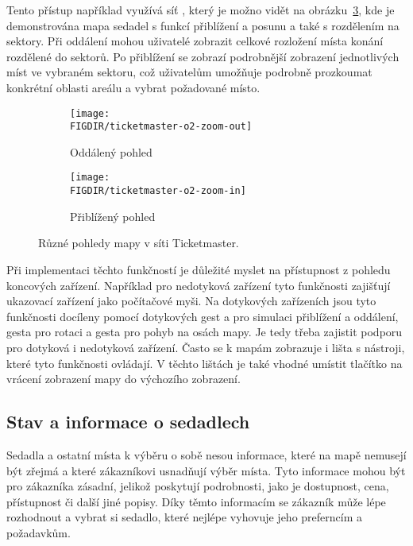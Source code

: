 Tento přístup například využívá síť , který je možno vidět na obrázku~\ref{fig:ticketmaster-o2-zoom}, kde je demonstrována mapa sedadel s funkcí přiblížení a posunu a také s rozdělením na sektory.
Při oddálení mohou uživatelé zobrazit celkové rozložení místa konání rozdělené do sektorů.
Po přiblížení se zobrazí podrobnější zobrazení jednotlivých míst ve vybraném sektoru, což uživatelům umožňuje podrobně prozkoumat konkrétní oblasti areálu a vybrat požadované místo.

\begin{figure}[H]
    \centering
    \begin{subfigure}{0.45\textwidth}
        \texttt{[image: \\FIGDIR/ticketmaster-o2-zoom-out]}
        \caption{Oddálený pohled}
        \label{fig:ticketmaster-o2-zoom-in}
    \end{subfigure}
    \hfill
    \begin{subfigure}{0.45\textwidth}
        \texttt{[image: \\FIGDIR/ticketmaster-o2-zoom-in]}
        \caption{Přiblížený pohled}
        \label{fig:ticketmaster-o2-zoom-out}
    \end{subfigure}

    \caption{Různé pohledy mapy v síti Ticketmaster.}
    \label{fig:ticketmaster-o2-zoom}
\end{figure}

Při implementaci těchto funkčností je důležité myslet na přístupnost z pohledu koncových zařízení.
Například pro nedotyková zařízení tyto funkčnosti zajišťují ukazovací zařízení jako počítačové myši.
Na dotykových zařízeních jsou tyto funkčnosti docíleny pomocí dotykových gest  a  pro simulaci přiblížení a oddálení, gesta  pro rotaci a gesta  pro pohyb na osách mapy.
Je tedy třeba zajistit podporu pro dotyková i nedotyková zařízení.
Často se k mapám zobrazuje i lišta s nástroji, které tyto funkčnosti ovládají.
V těchto lištách je také vhodné umístit tlačítko na vrácení zobrazení mapy do výchozího zobrazení.

\subsection{Stav a informace o sedadlech}
\label{subsec:specifikace-interaktivni-mapa-stav-a-informace-o-sedadlech}
Sedadla a ostatní místa k výběru o sobě nesou informace, které na mapě nemusejí být zřejmá a které zákazníkovi usnadňují výběr místa.
Tyto informace mohou být pro zákazníka zásadní, jelikož poskytují podrobnosti, jako je dostupnost, cena, přístupnost či další jiné popisy.
Díky těmto informacím se zákazník může lépe rozhodnout a vybrat si sedadlo, které nejlépe vyhovuje jeho preferncím a požadavkům.

